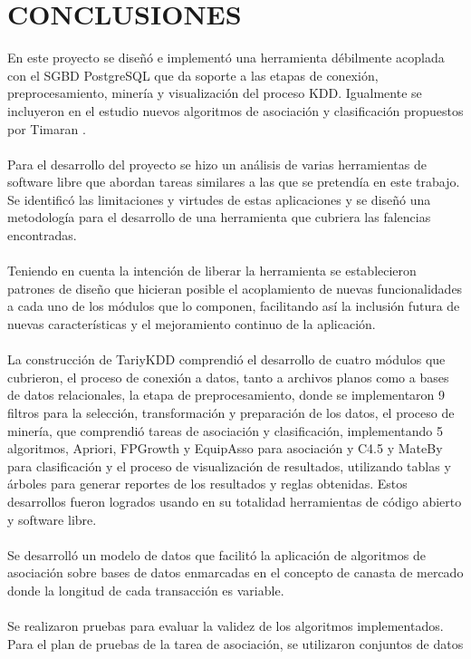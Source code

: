 \chapter{CONCLUSIONES}
En este proyecto se dise\~n\'o e implement\'o una herramienta d\'ebilmente acoplada con el SGBD PostgreSQL que da soporte a las etapas de conexi\'on, preprocesamiento, miner\'ia y visualizaci\'on del proceso KDD.  Igualmente se incluyeron en el estudio nuevos algoritmos de asociaci\'on y clasificaci\'on propuestos por Timaran \cite{32}.\\
\\
Para el desarrollo del proyecto se hizo un an\'alisis de varias herramientas de software libre que abordan tareas similares a las que se pretend\'ia en este trabajo.  Se identific\'o las limitaciones y virtudes de estas aplicaciones y se dise\~n\'o una metodolog\'ia para el desarrollo de una herramienta que cubriera las falencias encontradas.\\
\\
Teniendo en cuenta la intenci\'on de liberar la herramienta se establecieron patrones de dise\~no que hicieran posible el acoplamiento de nuevas funcionalidades a cada uno de los m\'odulos que lo componen, facilitando as\'i la inclusi\'on futura de nuevas caracter\'isticas y el mejoramiento continuo de la aplicaci\'on.\\
\\
La construcci\'on de TariyKDD comprendi\'o el desarrollo de cuatro m\'odulos que cubrieron, el proceso de conexi\'on a datos, tanto a archivos planos como a bases de datos relacionales, la etapa de preprocesamiento, donde se implementaron 9 filtros para la selecci\'on, transformaci\'on y preparaci\'on de los datos, el proceso de miner\'ia, que comprendi\'o tareas de asociaci\'on y clasificaci\'on, implementando 5 algoritmos, Apriori, FPGrowth y EquipAsso para asociaci\'on y C4.5 y MateBy para clasificaci\'on y el proceso de visualizaci\'on de resultados, utilizando tablas y \'arboles para generar reportes de los resultados y reglas obtenidas.  Estos desarrollos fueron logrados usando en su totalidad herramientas de c\'odigo abierto y software libre.\\
\\
Se desarroll\'o un modelo de datos que facilit\'o la aplicaci\'on de algoritmos de asociaci\'on sobre bases de datos enmarcadas en el concepto de canasta de mercado donde la longitud de cada transacci\'on es variable.\\
\\
Se realizaron pruebas para evaluar la validez de los algoritmos implementados. Para el plan de pruebas de la tarea de asociaci\'on, se utilizaron conjuntos de datos
